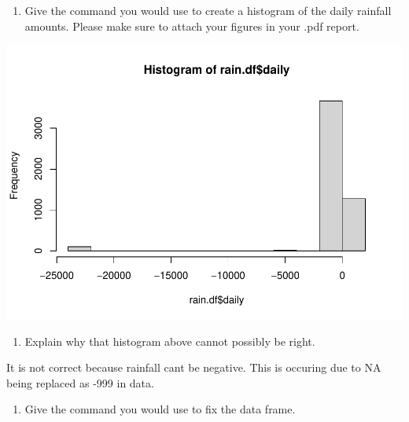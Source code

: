 \documentclass[
]{article}
\newenvironment{Shaded}{\begin{snugshade}}{\end{snugshade}}
\newcommand{\AttributeTok}[1]{\textcolor[rgb]{0.77,0.63,0.00}{#1}}
\newcommand{\ConstantTok}[1]{\textcolor[rgb]{0.00,0.00,0.00}{#1}}
\newcommand{\DecValTok}[1]{\textcolor[rgb]{0.00,0.00,0.81}{#1}}
\newcommand{\FunctionTok}[1]{\textcolor[rgb]{0.00,0.00,0.00}{#1}}
\newcommand{\NormalTok}[1]{#1}
\newcommand{\OtherTok}[1]{\textcolor[rgb]{0.56,0.35,0.01}{#1}}
\newcommand{\SpecialCharTok}[1]{\textcolor[rgb]{0.00,0.00,0.00}{#1}}
\providecommand{\tightlist}{%
  \setlength{\itemsep}{0pt}\setlength{\parskip}{0pt}}
\begin{document}
\begin{enumerate}
\def\labelenumi{\alph{enumi}.}
\setcounter{enumi}{7}
\tightlist
\item
  Give the command you would use to create a histogram of the daily
  rainfall amounts. Please make sure to attach your figures in your .pdf
  report.
\end{enumerate}

\begin{Shaded}
\end{Shaded}

\includegraphics{HW1-Trinath-Sai-Subhash-Reddy-Pittala_files/figure-latex/unnamed-chunk-9-1.pdf}

\begin{enumerate}
\def\labelenumi{\roman{enumi}.}
\tightlist
\item
  Explain why that histogram above cannot possibly be right.
\end{enumerate}

It is not correct because rainfall cant be negative. This is occuring
due to NA being replaced as -999 in data.

\begin{enumerate}
\def\labelenumi{\alph{enumi}.}
\setcounter{enumi}{9}
\tightlist
\item
  Give the command you would use to fix the data frame.
\end{enumerate}

\begin{Shaded}
\end{Shaded}
\end{document}
